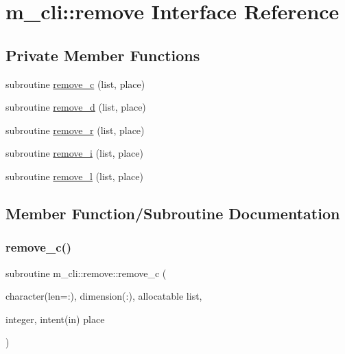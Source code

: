 \hypertarget{interfacem__cli_1_1remove}{}\section{m\+\_\+cli\+:\+:remove Interface Reference}
\label{interfacem__cli_1_1remove}
\subsection*{Private Member Functions}
\begin{DoxyCompactItemize}
\item 
subroutine \mbox{\hyperlink{interfacem__cli_1_1remove_a3742d63ad5d2a2e916a75bae43c4422b}{remove\+\_\+c}} (list, place)
\item 
subroutine \mbox{\hyperlink{interfacem__cli_1_1remove_ab1f0d48faa67f5ada3b7c67b6c4e6efe}{remove\+\_\+d}} (list, place)
\item 
subroutine \mbox{\hyperlink{interfacem__cli_1_1remove_a37084cd7166efe0231e50a8ba9d99bac}{remove\+\_\+r}} (list, place)
\item 
subroutine \mbox{\hyperlink{interfacem__cli_1_1remove_ada40f4218cbbff786409693c0e5b4e8f}{remove\+\_\+i}} (list, place)
\item 
subroutine \mbox{\hyperlink{interfacem__cli_1_1remove_a934593716f18cbe5c58e2b0af7ddb38f}{remove\+\_\+l}} (list, place)
\end{DoxyCompactItemize}


\subsection{Member Function/\+Subroutine Documentation}
\mbox{\label{interfacem__cli_1_1remove_a3742d63ad5d2a2e916a75bae43c4422b}} 
\subsubsection{\texorpdfstring{remove\+\_\+c()}{remove\_c()}}
{\footnotesize\ttfamily subroutine m\+\_\+cli\+::remove\+::remove\+\_\+c (\begin{DoxyParamCaption}\item[{character(len=\+:), dimension(\+:), allocatable}]{list,  }\item[{integer, intent(in)}]{place }\end{DoxyParamCaption})\hspace{0.3cm}{\ttfamily [private]}}

